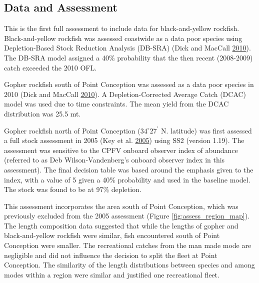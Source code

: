 \documentclass[12pt,]{article}
\begin{document}
\FloatBarrier

\newpage

\subsection*{Data and Assessment}\label{data-and-assessment}

This is the first full assessment to include data for black-and-yellow
rockfish. Black-and-yellow rockfish was assessed coastwide as a data
poor species using Depletion-Based Stock Reduction Analysis (DB-SRA)
(Dick and MacCall \protect\hyperlink{ref-Dick2010}{2010}). The DB-SRA
model assigned a 40\% probability that the then recent (2008-2009) catch
exceeded the 2010 OFL.

Gopher rockfish south of Point Conception was assessed as a data poor
species in 2010 (Dick and MacCall
\protect\hyperlink{ref-Dick2010}{2010}). A Depletion-Corrected Average
Catch (DCAC) model was used due to time constraints. The mean yield from
the DCAC distribution was 25.5 mt.

Gopher rockfish north of Point Conception (\(34^\circ 27^\prime\) N.
latitude) was first assessed a full stock assessment in 2005 (Key et al.
\protect\hyperlink{ref-Key2005}{2005}) using SS2 (version 1.19). The
assessment was sensitive to the CPFV onboard observer index of abundance
(referred to as Deb Wilson-Vandenberg's onboard observer index in this
assessment). The final decision table was based around the emphasis
given to the index, with a value of 5 given a 40\% probability and used
in the baseline model. The stock was found to be at 97\% depletion.

This assessment incorporates the area south of Point Conception, which
was previously excluded from the 2005 assessment (Figure
\ref{fig:assess_region_map}). The length composition data suggested that
while the lengths of gopher and black-and-yellow rockfish were similar,
fish encountered south of Point Conception were smaller. The
recreational catches from the man made mode are negligible and did not
influence the decision to split the fleet at Point Conception. The
similarity of the length distributions between species and among modes
within a region were similar and justified one recreational fleet.
\end{document}
